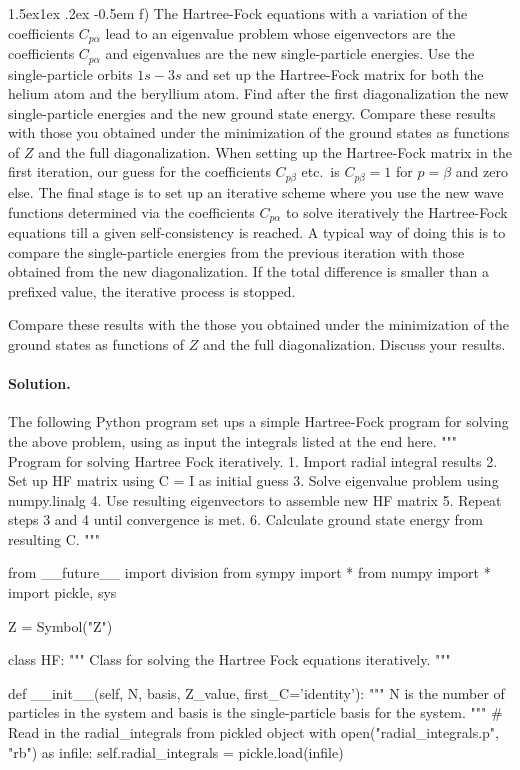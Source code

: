 \documentclass[%
oneside,                 %
final,                   %
10pt]{article}
\makeatletter
\newenvironment{doconceexercise}{}{}
\newcommand\subex{\@startsection{paragraph}{4}{\z@}%
                  {1.5ex\@plus1ex \@minus.2ex}%
                  {-0.5em}%
                  {\normalfont\normalsize\bfseries}}
\makeatother
\begin{document}
\begin{doconceexercise}
\subex{f)}
The Hartree-Fock equations with a variation of the coefficients $C_{p\alpha}$
lead to an eigenvalue problem whose eigenvectors are the coefficients
$C_{p\alpha}$ and eigenvalues are the new single-particle energies. 
Use the single-particle orbits $1s-3s$ and set up the Hartree-Fock matrix for both the helium atom and the beryllium atom. Find after the first diagonalization the new single-particle energies and the new ground state energy.
Compare these results with  those you obtained under the minimization of the ground states as functions of $Z$ and the full diagonalization. When setting up the Hartree-Fock matrix 
in the first iteration, our guess for the coefficients $C_{p\beta}$ etc.~is $C_{p\beta}=1$ for $p=\beta$ and zero else. 
The final stage is to 
set up an iterative scheme where you use the new wave functions
determined via the coefficients $C_{p\alpha}$ to solve iteratively the Hartree-Fock equations till a given self-consistency is reached. A typical way of doing this is to compare the single-particle energies from the previous iteration with those obtained from the new diagonalization. If the total difference is smaller than a prefixed value, the iterative process is stopped. 

Compare these results with the those you obtained under the minimization of the ground states as functions of $Z$ and the full diagonalization. Discuss your results.


\paragraph{Solution.}
The following Python program set ups a simple Hartree-Fock program for solving the above problem, using as input the integrals listed at the end here.
\bpycod
"""
Program for solving Hartree Fock iteratively.
1. Import radial integral results
2. Set up HF matrix using C = I as initial guess
3. Solve eigenvalue problem using numpy.linalg
4. Use resulting eigenvectors to assemble new HF matrix
5. Repeat steps 3 and 4 until convergence is met.
6. Calculate ground state energy from resulting C.
"""

from __future__ import division
from sympy import *
from numpy import *
import pickle, sys

Z = Symbol("Z")

class HF:
    """
    Class for solving the Hartree Fock equations iteratively.
    """

    def __init__(self, N, basis, Z_value, first_C='identity'):
        """
        N is the number of particles in the system and basis
        is the single-particle basis for the system.
        """
        # Read in the radial_integrals from pickled object
        with open("radial_integrals.p", "rb") as infile:
            self.radial_integrals = pickle.load(infile)
        

\end{doconceexercise}
\end{document}
